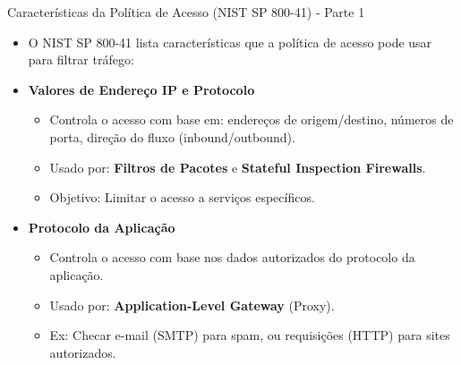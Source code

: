\begin{frame}{Características da Política de Acesso (NIST SP 800-41) - Parte 1}
    \begin{itemize}
        \item O NIST SP 800-41 lista características que a política de acesso pode usar para filtrar tráfego:

        \item \textbf{Valores de Endereço IP e Protocolo}
              \begin{itemize}
                  \item Controla o acesso com base em: endereços de origem/destino, números de porta, direção do fluxo (inbound/outbound).
                  \item Usado por: \textbf{Filtros de Pacotes} e \textbf{Stateful Inspection Firewalls}.
                  \item Objetivo: Limitar o acesso a serviços específicos.
              \end{itemize}

        \item \textbf{Protocolo da Aplicação}
              \begin{itemize}
                  \item Controla o acesso com base nos dados autorizados do protocolo da aplicação.
                  \item Usado por: \textbf{Application-Level Gateway} (Proxy).
                  \item Ex: Checar e-mail (SMTP) para spam, ou requisições (HTTP) para sites autorizados.
              \end{itemize}
    \end{itemize}
\end{frame}

